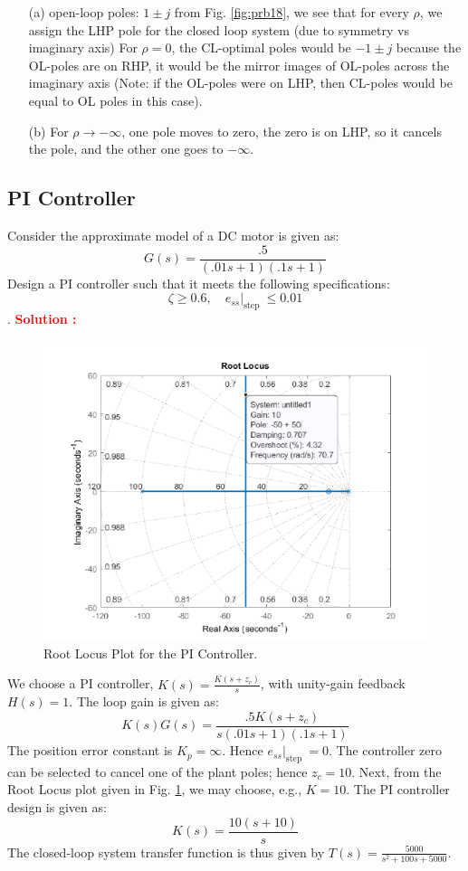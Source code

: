 \documentclass[12pt]{article}
\begin{document}
\begin{itemize}
  
\item [(a)] open-loop poles: $1 \pm j$  from Fig. \ref{fig:prb18}, we see that for every $\rho$, we assign the LHP pole for the closed loop system (due to symmetry vs imaginary axis)
For $\rho=0$, the CL-optimal poles would be $-1 \pm j$ because the OL-poles are on RHP, it would be the mirror images of OL-poles across the imaginary axis (Note: if the OL-poles were on LHP, then CL-poles would be equal to OL poles in this case).
\item [(b)] For $\rho \rightarrow -\infty$, one pole moves to zero, the zero is on LHP, so it cancels the pole, and the other one goes to $- \infty$.

\end{itemize}
\clearpage

\subsection{PI Controller}

 Consider the approximate model of a DC motor is given as: $$G(s)=\frac{.5}{(.01 s+1)(.1 s+1)}$$
 Design a PI controller such that it meets the following specifications: $$\zeta \geq 0.6,\left.\quad e_{s s}\right|_{\text {step }} \leq 0.01$$.
 \textbf{\textcolor{red}{Solution :}} \\
 \begin{figure}[h!]
     \centering
     \includegraphics[width=0.75\linewidth]{figs/7.4.png}
     \caption{Root Locus Plot for the PI Controller.}
     \label{fig:prb19}
 \end{figure}
We choose a PI controller, $K(s)=\frac{K\left(s+z_c\right)}{s}$, with unity-gain feedback $H(s)=1$. The loop gain is given as: 
$$K(s) G(s)=\frac{.5 K\left(s+z_c\right)}{s(.01 s+1)(.1 s+1)}$$
The position error constant is $K_p=\infty$. Hence $\left.e_{s s}\right|_{\text {step }}=0$.
The controller zero can be selected to cancel one of the plant poles; hence $z_c=10$. Next, from the Root Locus plot given in Fig. \ref{fig:prb19}, we may choose, e.g., $K=10$. The PI controller design is given as: $$K(s)=\frac{10(s+10)}{s}$$
The closed-loop system transfer function is thus given by $T(s)=\frac{5000}{s^2+100 s+5000}$. 
\end{document}
